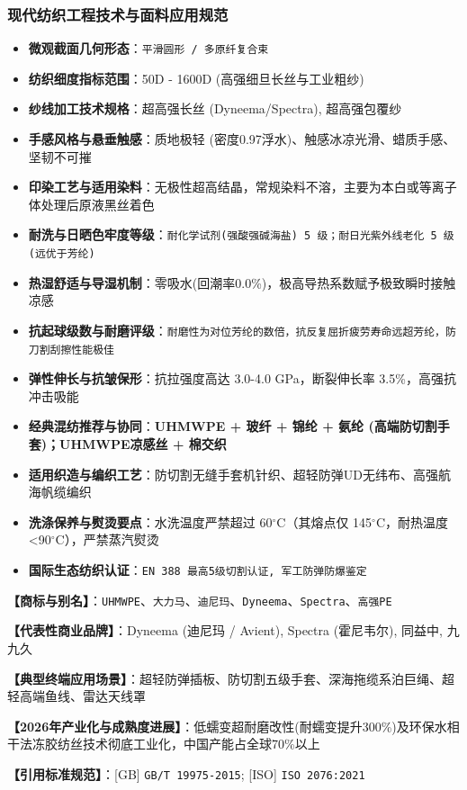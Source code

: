 \documentclass[11pt,openright,twoside,UTF8]{ctexbook}
\begin{document}
\subsubsection*{现代纺织工程技术与面料应用规范}
\begin{itemize} \setlength{\itemsep}{2pt}
    \item \textbf{微观截面几何形态}：\texttt{平滑圆形 / 多原纤复合束}
    \item \textbf{纺织细度指标范围}：50D - 1600D (高强细旦长丝与工业粗纱)
    \item \textbf{纱线加工技术规格}：超高强长丝 (Dyneema/Spectra), 超高强包覆纱
    \item \textbf{手感风格与悬垂触感}：质地极轻 (密度0.97浮水)、触感冰凉光滑、蜡质手感、坚韧不可摧
    \item \textbf{印染工艺与适用染料}：无极性超高结晶，常规染料不溶，主要为本白或等离子体处理后原液黑丝着色
    \item \textbf{耐洗与日晒色牢度等级}：\texttt{耐化学试剂(强酸强碱海盐) 5 级；耐日光紫外线老化 5 级(远优于芳纶)}
    \item \textbf{热湿舒适与导湿机制}：零吸水(回潮率0.0\%)，极高导热系数赋予极致瞬时接触凉感
    \item \textbf{抗起球级数与耐磨评级}：\texttt{耐磨性为对位芳纶的数倍，抗反复屈折疲劳寿命远超芳纶，防刀割刮擦性能极佳}
    \item \textbf{弹性伸长与抗皱保形}：抗拉强度高达 3.0-4.0 GPa，断裂伸长率 3.5\%，高强抗冲击吸能
    \item \textbf{经典混纺推荐与协同}：\textbf{UHMWPE + 玻纤 + 锦纶 + 氨纶 (高端防切割手套)；UHMWPE凉感丝 + 棉交织}
    \item \textbf{适用织造与编织工艺}：防切割无缝手套机针织、超轻防弹UD无纬布、高强航海帆缆编织
    \item \textbf{洗涤保养与熨烫要点}：水洗温度严禁超过 60$^\circ\mathrm{C}$（其熔点仅 145$^\circ\mathrm{C}$，耐热温度\textless{}90$^\circ\mathrm{C}$），严禁蒸汽熨烫
    \item \textbf{国际生态纺织认证}：\texttt{EN 388 最高5级切割认证, 军工防弹防爆鉴定}
\end{itemize}
\vspace{0.2cm}

\noindent\textbf{【商标与别名】}：\texttt{UHMWPE}、\texttt{大力马}、\texttt{迪尼玛}、\texttt{Dyneema}、\texttt{Spectra}、\texttt{高强PE}\par
\noindent\textbf{【代表性商业品牌】}：Dyneema (迪尼玛 / Avient), Spectra (霍尼韦尔), 同益中, 九九久\par
\noindent\textbf{【典型终端应用场景】}：超轻防弹插板、防切割五级手套、深海拖缆系泊巨绳、超轻高端鱼线、雷达天线罩\par
\noindent\textbf{【2026年产业化与成熟度进展】}：低蠕变超耐磨改性(耐蠕变提升300\%)及环保水相干法冻胶纺丝技术彻底工业化，中国产能占全球70\%以上\par
\noindent\textbf{【引用标准规范】}：[GB] \texttt{GB/T 19975-2015}; [ISO] \texttt{ISO 2076:2021}\par
\vspace{0.5cm}
\end{document}
